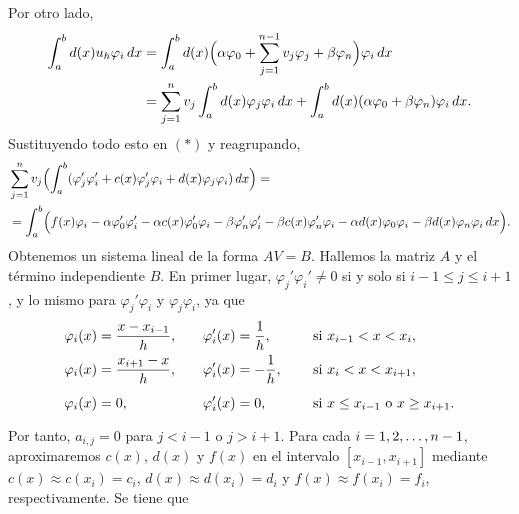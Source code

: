 \documentclass[a4paper, 10pt, oneside]{report}
\begin{document}
Por otro lado,
\begin{align*}
    \int_a^b d(x)u_h\varphi_i \, dx &= \int_a^b d(x)\Bigl(\alpha \varphi_0 + \sum_{j=1}^{n-1}v_j\varphi_j + \beta \varphi_n\Bigr)\varphi_i \, dx \\
    &= \sum_{j=1}^n v_j\int_a^b d(x)\varphi_j\varphi_i\, dx + \int_a^bd(x)(\alpha\varphi_0+\beta\varphi_n)\varphi_i \, dx.
\end{align*}
Sustituyendo todo esto en $(\ast)$ y reagrupando,
\begin{align*}
    &\sum_{j=1}^n v_j \Bigl(\int_a^b (\varphi_j'\varphi_i'+c(x)\varphi_j'\varphi_i+d(x)\varphi_j\varphi_i) \, dx \Bigr) = \\
    &= \int_a^b \Bigl(f(x)\varphi_i-\alpha\varphi_0'\varphi_i'-\alpha c(x)\varphi_0'\varphi_i-\beta\varphi_n'\varphi_i'-\beta c(x)\varphi_n' \varphi_i - \alpha d(x)\varphi_0\varphi_i- \beta d(x)\varphi_n\varphi_i\, dx\Bigr).
\end{align*}
Obtenemos un sistema lineal de la forma $AV = B$. Hallemos la matriz $A$ y el término independiente $B$. En primer lugar, $\varphi_j'\varphi_i' \neq 0$ si y solo si $i-1 \leq j \leq i+1$, y lo mismo para $\varphi_j'\varphi_i$ y $\varphi_j\varphi_i$, ya que
\[
\begin{alignedat}{5}
    \varphi_i(x) &=\frac{x-x_{i-1}}{h}, \qquad &\varphi_i'(x) &= \frac{1}{h}, &\qquad &\textup{ si } x_{i-1} < x < x_i, \\
    \varphi_i(x) &=\frac{x_{i+1}-x}{h}, \qquad &\varphi_i'(x) &= -\frac{1}{h}, &\qquad &\textup{ si } x_{i} < x < x_{i+1}, \\
    \varphi_i(x) &= 0, \qquad &\varphi_i'(x) &= 0\vphantom{\frac{1}{h}}, &\qquad &\textup{ si } x \leq x_{i-1} \textup{ o } x \geq x_{i+1}. \\
\end{alignedat}
\]
Por tanto, $a_{i,j} = 0$ para $j < i-1$ o $j > i+1$. Para cada $i = 1,2,\mathellipsis,n-1$, aproximaremos $c(x)$, $d(x)$ y $f(x)$ en el intervalo $[x_{i-1},x_{i+1}]$ mediante $c(x) \approx c(x_i) = c_i$, $d(x) \approx d(x_i) = d_i$ y $f(x) \approx f(x_i) = f_i$, respectivamente. Se tiene que
\allowdisplaybreaks
\end{document}
